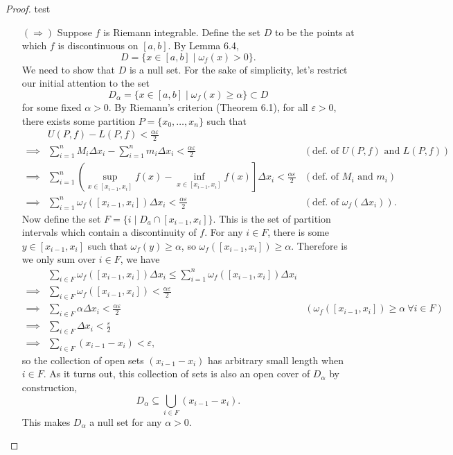 \documentclass{article}
\theoremstyle{definition}
\begin{document}
	\begin{proof}
		{\color{white}test}
		\begin{enumerate}
			\item [$ (\Longrightarrow) $] Suppose $ f $ is Riemann integrable. Define the set $ D $ to be the points at which $ f $ is discontinuous on $ [a,b] $. By Lemma 6.4,
			$$ D=\{x\in[a,b] \mid \omega_f(x)>0\}. $$
			We need to show that $ D $ is a null set. For the sake of simplicity, let's restrict our initial attention to the set $$ D_\alpha =  \{x\in[a,b] \mid \omega_f(x)\ge \alpha\}\subset D$$ for some fixed $ \alpha > 0 $. By Riemann's criterion (Theorem 6.1), for all $ \varepsilon>0 $, there exists some partition $ P=\{x_0,\ldots, x_n\} $ such that 
			\begin{align*}
				&U(P,f)-L(P,f)<\frac{\alpha\varepsilon}{2}\\
				\implies & \sum_{i=1}^{n}M_i\Delta x_i - \sum_{i=1}^{n}m_i\Delta x_i <\frac{\alpha\varepsilon}{2}& (\text{def. of }U(P,f)\text{ and }L(P,f))\\
				\implies & \sum_{i=1}^{n}\left(\sup_{x\in[x_{i-1}, x_i]}f(x) - \inf_{x\in[x_{i-1}, x_i]}f(x)\right]\Delta x_i <\frac{\alpha\varepsilon}{2}& (\text{def. of }M_i\text{ and }m_i)\\
				\implies & \sum_{i=1}^{n}\omega_f([x_{i-1}, x_i])\Delta x_i <\frac{\alpha\varepsilon}{2}& (\text{def. of }\omega_f(\Delta x_i)).
			\end{align*}
			Now define the set $ F = \{i \mid D_a\cap [x_{i-1}, x_i]\}$. This is the set of partition intervals which contain a discontinuity of $ f $. For any $ i\in F $, there is some $ y\in[x_{i-1}, x_i] $ such that $ \omega_f(y)\ge \alpha $, so $ \omega_f([x_{i-1}, x_i]) \ge \alpha $.  Therefore is we only sum over $ i\in F $, we have 
			\begin{align*}
				&\sum_{i\in F}\omega_f([x_{i-1}, x_i])\Delta x_i \le \sum_{i=1}^{n}\omega_f([x_{i-1}, x_i])\Delta x_i\\
				\implies & \sum_{i\in F}\omega_f([x_{i-1}, x_i])<\frac{\alpha\varepsilon}{2}\\
				\implies & \sum_{i\in F}\alpha \Delta x_i <  \frac{\alpha\varepsilon}{2} & (\omega_f([x_{i-1}, x_i]) \ge \alpha\ \forall i \in F)\\
				\implies & \sum_{i\in F} \Delta x_i < \frac{\varepsilon}{2}\\
				\implies & \sum_{i\in F}  (x_{i-1}- x_i)< \varepsilon,
			\end{align*}
			so the collection of open sets $ (x_{i-1}-x_i) $ has arbitrary small length when $ i\in F $. As it turns out, this collection of sets is also an open cover of $ D_\alpha $ by construction, $$ D_\alpha \subseteq \bigcup_{i\in F}(x_{i-1}- x_i).$$ This makes $ D_\alpha $ a null set for any $ \alpha > 0 $.
			

\end{enumerate}
\end{proof}
\end{document}
